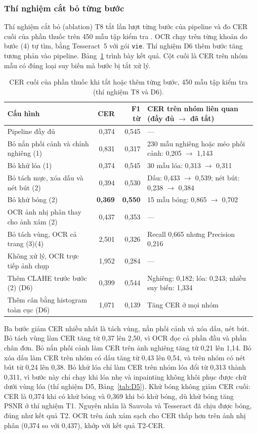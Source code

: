\subsubsection{Thí nghiệm cắt bỏ từng bước}
Thí nghiệm cắt bỏ (ablation) T8 tắt lần lượt từng bước của pipeline và đo CER cuối của phần thuốc trên 450 mẫu tập kiểm tra .
OCR chạy trên từng khoản do bước (4) tự tìm, bằng Tesseract~5 với gói \texttt{vie}.
Thí nghiệm D6 thêm bước tăng tương phản vào pipeline.
Bảng~\ref{tab:T8} trình bày kết quả.
Cột cuối là CER trên nhóm mẫu có đúng loại suy biến mà bước bị tắt xử lý.

\begin{table}[H]
\centering
\caption{CER cuối của phần thuốc khi tắt hoặc thêm từng bước, 450 mẫu tập kiểm tra  (thí nghiệm T8 và D6).}\label{tab:T8}
\small
\begin{tabularx}{\linewidth}{lrrX}
\toprule
\textbf{Cấu hình} & \textbf{CER} & \textbf{F1 từ} & \textbf{CER trên nhóm liên quan (đầy đủ $\rightarrow$ đã tắt)} \\
\midrule
Pipeline đầy đủ & 0,374 & 0,545 & --- \\
Bỏ nắn phối cảnh và chỉnh nghiêng (1) & 0,831 & 0,317 & 230 mẫu nghiêng hoặc méo phối cảnh: 0,205 $\rightarrow$ 1,143 \\
Bỏ khử lóa (1) & 0,374 & 0,545 & 30 mẫu lóa: 0,313 $\rightarrow$ 0,311 \\
Bỏ tách mực, xóa dấu và nét bút (2) & 0,394 & 0,530 & Dấu: 0,433 $\rightarrow$ 0,539; nét bút: 0,238 $\rightarrow$ 0,384 \\
Bỏ khử bóng (2) & \textbf{0,369} & \textbf{0,550} & 15 mẫu bóng: 0,865 $\rightarrow$ 0,702 \\
OCR ảnh nhị phân thay cho ảnh xám (2) & 0,437 & 0,353 & --- \\
Bỏ tách vùng, OCR cả trang (3)(4) & 2,501 & 0,326 & Recall 0,665 nhưng Precision 0,216 \\
Không xử lý, OCR trực tiếp ảnh chụp & 1,952 & 0,284 & --- \\
\midrule
Thêm CLAHE trước bước (2) (D6) & 0,399 & 0,544 & Nghiêng: 0,182; lóa: 0,243; nhiều suy biến: 1,334 \\
Thêm cân bằng histogram toàn cục (D6) & 1,071 & 0,139 & Tăng CER ở mọi nhóm \\
\bottomrule
\end{tabularx}
\end{table}

Ba bước giảm CER nhiều nhất là tách vùng, nắn phối cảnh và xóa dấu, nét bút.
Bỏ tách vùng làm CER tăng từ 0,37 lên 2,50, vì OCR đọc cả phần đầu và phần chân đơn.
Bỏ nắn phối cảnh làm CER trên ảnh nghiêng tăng từ 0,21 lên 1,14.
Bỏ xóa dấu làm CER trên nhóm có dấu tăng từ 0,43 lên 0,54, và trên nhóm có nét bút từ 0,24 lên 0,38.
Bỏ khử lóa chỉ làm CER trên nhóm lóa đổi từ 0,313 thành 0,311, vì bước này chỉ chạy khi lóa nhẹ và inpainting không khôi phục được chữ dưới vùng lóa (thí nghiệm D5, Bảng~\ref{tab:D5}).
Khử bóng không giảm CER cuối: CER là 0,374 khi có khử bóng và 0,369 khi bỏ khử bóng, dù khử bóng tăng PSNR ở thí nghiệm T1.
Nguyên nhân là Sauvola và Tesseract đã chịu được bóng, đúng như kết quả T2.
OCR trên ảnh xám sạch cho CER thấp hơn trên ảnh nhị phân (0,374 so với 0,437), khớp với kết quả T2-CER.

